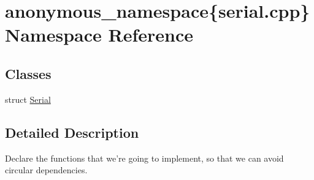 \hypertarget{namespaceanonymous__namespace_02serial_8cpp_03}{\section{anonymous\-\_\-namespace\{serial.\-cpp\} Namespace Reference}
\label{namespaceanonymous__namespace_02serial_8cpp_03}
}
\subsection*{Classes}
\begin{DoxyCompactItemize}
\item 
struct \hyperlink{structanonymous__namespace_02serial_8cpp_03_1_1Serial}{Serial}
\end{DoxyCompactItemize}


\subsection{Detailed Description}
Declare the functions that we're going to implement, so that we can avoid circular dependencies. 